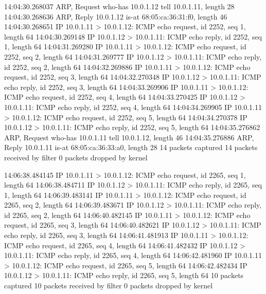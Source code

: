 14:04:30.268037 ARP, Request who-has 10.0.1.12 tell 10.0.1.11, length 28
14:04:30.268636 ARP, Reply 10.0.1.12 is-at 68:05:ca:36:31:f0, length 46
14:04:30.268651 IP 10.0.1.11 > 10.0.1.12: ICMP echo request, id 2252, seq 1, length 64
14:04:30.269148 IP 10.0.1.12 > 10.0.1.11: ICMP echo reply, id 2252, seq 1, length 64
14:04:31.269280 IP 10.0.1.11 > 10.0.1.12: ICMP echo request, id 2252, seq 2, length 64
14:04:31.269777 IP 10.0.1.12 > 10.0.1.11: ICMP echo reply, id 2252, seq 2, length 64
14:04:32.269886 IP 10.0.1.11 > 10.0.1.12: ICMP echo request, id 2252, seq 3, length 64
14:04:32.270348 IP 10.0.1.12 > 10.0.1.11: ICMP echo reply, id 2252, seq 3, length 64
14:04:33.269906 IP 10.0.1.11 > 10.0.1.12: ICMP echo request, id 2252, seq 4, length 64
14:04:33.270425 IP 10.0.1.12 > 10.0.1.11: ICMP echo reply, id 2252, seq 4, length 64
14:04:34.269905 IP 10.0.1.11 > 10.0.1.12: ICMP echo request, id 2252, seq 5, length 64
14:04:34.270378 IP 10.0.1.12 > 10.0.1.11: ICMP echo reply, id 2252, seq 5, length 64
14:04:35.276862 ARP, Request who-has 10.0.1.11 tell 10.0.1.12, length 46
14:04:35.276886 ARP, Reply 10.0.1.11 is-at 68:05:ca:36:33:a0, length 28
14 packets captured
14 packets received by filter
0 packets dropped by kernel

14:06:38.484145 IP 10.0.1.11 > 10.0.1.12: ICMP echo request, id 2265, seq 1, length 64
14:06:38.484711 IP 10.0.1.12 > 10.0.1.11: ICMP echo reply, id 2265, seq 1, length 64
14:06:39.483141 IP 10.0.1.11 > 10.0.1.12: ICMP echo request, id 2265, seq 2, length 64
14:06:39.483671 IP 10.0.1.12 > 10.0.1.11: ICMP echo reply, id 2265, seq 2, length 64
14:06:40.482145 IP 10.0.1.11 > 10.0.1.12: ICMP echo request, id 2265, seq 3, length 64
14:06:40.482621 IP 10.0.1.12 > 10.0.1.11: ICMP echo reply, id 2265, seq 3, length 64
14:06:41.481913 IP 10.0.1.11 > 10.0.1.12: ICMP echo request, id 2265, seq 4, length 64
14:06:41.482432 IP 10.0.1.12 > 10.0.1.11: ICMP echo reply, id 2265, seq 4, length 64
14:06:42.481960 IP 10.0.1.11 > 10.0.1.12: ICMP echo request, id 2265, seq 5, length 64
14:06:42.482434 IP 10.0.1.12 > 10.0.1.11: ICMP echo reply, id 2265, seq 5, length 64
10 packets captured
10 packets received by filter
0 packets dropped by kernel
